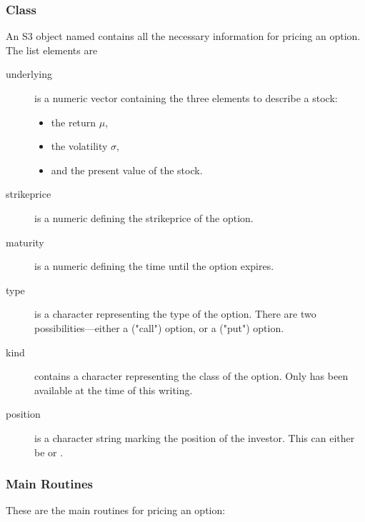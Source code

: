 \subsubsection{Class }

An S3 object named  contains all
the necessary information for pricing an option. The list elements are

\begin{description}
\item[underlying] is a numeric vector containing the three elements to
  describe a stock:
  \begin{itemize}
  \item the return $\mu$,
  \item the volatility $\sigma$,
  \item and the present value of the stock.
  \end{itemize}
\item[strikeprice] is a numeric defining the strikeprice of the option.
\item[maturity] is a numeric defining the time until the option expires.
\item[type] is a character representing the type of the option. There
  are two possibilities---either a \code("call") option, or a
  \code("put") option.
\item[kind] contains a character representing the class of the
  option. Only  has been available at the time of
  this writing. 
\item[position] is a character string marking the position of the
  investor. This can either be  or .
\end{description}


\subsubsection{Main Routines}

These are the main routines for pricing an option:

